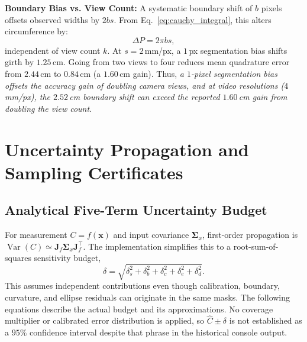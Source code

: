 \documentclass[journal]{IEEEtran}
\begin{document}
\noindent \textbf{Boundary Bias vs. View Count:} 
A systematic boundary shift of $b$ pixels offsets observed widths by $2bs$. From Eq.~\eqref{eq:cauchy_integral}, this alters circumference by:
\begin{equation}
\Delta P = 2\pi b s,
\label{eq:boundary_bias}
\end{equation}
independent of view count $k$. At $s = 2$\,mm/px, a $1$\,px segmentation bias shifts girth by $1.25$\,cm. Going from two views to four reduces mean quadrature error from $2.44$\,cm to $0.84$\,cm (a $1.60$\,cm gain). Thus, \textit{a $1$-pixel segmentation bias offsets the accuracy gain of doubling camera views, and at video resolutions ($4$\,mm/px), the $2.52$\,cm boundary shift can exceed the reported $1.60$\,cm gain from doubling the view count}.

\section{Uncertainty Propagation and Sampling Certificates}
\label{sec:uncertainty}

\subsection{Analytical Five-Term Uncertainty Budget}
\label{subsec:uncertainty_budget}
For measurement $C=f(\mathbf x)$ and input covariance $\mathbf\Sigma_x$, first-order propagation is $\operatorname{Var}(C)\simeq\mathbf J_f\mathbf\Sigma_x\mathbf J_f^\top$. The implementation simplifies this to a root-sum-of-squares sensitivity budget,
\begin{equation}
\delta=\sqrt{\delta_s^2+\delta_b^2+\delta_c^2+\delta_e^2+\delta_d^2}.
\label{eq:total_quadrature}
\end{equation}
This assumes independent contributions even though calibration, boundary, curvature, and ellipse residuals can originate in the same masks. The following equations describe the actual budget and its approximations. No coverage multiplier or calibrated error distribution is applied, so $\hat C\pm\delta$ is not established as a $95\%$ confidence interval despite that phrase in the historical console output.
\end{document}
